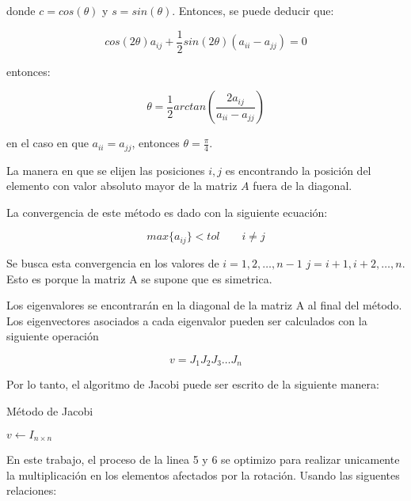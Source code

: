 donde $c=cos(\theta)$ y $s=sin(\theta)$. Entonces, se puede deducir que:

\begin{equation*}
    cos(2\theta)a_{ij}+\frac{1}{2}sin(2\theta)(a_{ii}-a_{jj})=0
\end{equation*}

entonces:

\begin{equation*}
    \theta = \frac{1}{2}arctan\left(\frac{2a_{ij}}{a_{ii}-a_{jj}}\right)
\end{equation*}

en el caso en que $a_{ii}=a_{jj}$, entonces $\theta=\frac{\pi}{4}$.

La manera en que se elijen las posiciones $i,j$ es encontrando la posición del elemento con valor absoluto mayor de la matriz $A$ fuera de la diagonal.

La convergencia de este método es dado con la siguiente ecuación:

\begin{equation*}
    max\{a_{ij}\} < tol \qquad i\neq j
\end{equation*}


Se busca esta convergencia en los valores de  $i=1,2,\dots,n-1$ $j=i+1,i+2,\dots,n$. Esto es porque la matriz A se supone que es simetrica.

Los eigenvalores se encontrarán en la diagonal de la matriz A al final del método. Los eigenvectores asociados a cada eigenvalor pueden ser calculados con la siguiente operación

\begin{equation*}
    v = J_1J_2J_3\dots J_n
\end{equation*}

Por lo tanto, el algoritmo de Jacobi puede ser escrito de la siguiente manera:

\begin{algorithm}[H]
    \caption{Método de Jacobi}
    \label{alg:jacobi_method}
    $v \gets I_{n\times n}$\\
\end{algorithm}

En este trabajo, el proceso de la linea 5 y 6 se optimizo para realizar unicamente la multiplicación en los elementos afectados por la rotación. Usando las siguentes relaciones:

